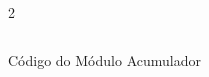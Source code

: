 \begin{figure}[H]
    \centering   
    \begin{tcolorbox}  
        \begin{multicols}{2} 
        \fontsize{9pt}{9pt}\selectfont\inputminted[obeytabs=true,tabsize=4,xleftmargin=20pt,linenos,breaklines]{VHDL}{VHDL/files/SquareSum.vhd}    
        \end{multicols}
    \end{tcolorbox}   
    \caption{Código do Módulo Acumulador}
\end{figure}